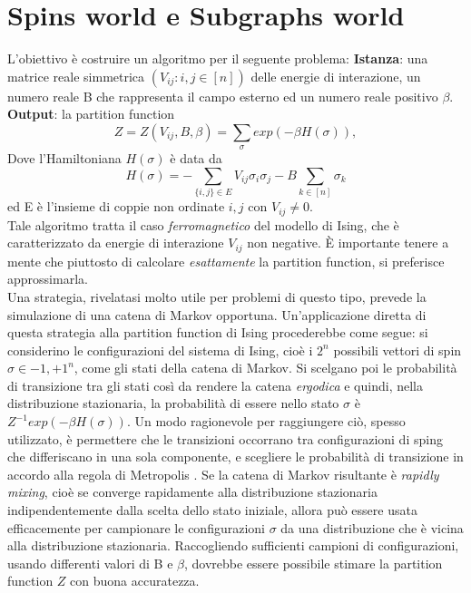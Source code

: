 \section{Spins world e Subgraphs world}
L'obiettivo è costruire un algoritmo per il seguente problema:
\textbf{Istanza}: una matrice reale simmetrica $(V_{ij} : i,j \in [n])$ delle energie di interazione, un numero reale B che rappresenta il campo esterno ed un numero reale positivo $\beta$.
\textbf{Output}: la partition function
\begin{equation}
	Z = Z(V_{ij}, B, \beta) = \sum_{\sigma}{exp(-\beta H(\sigma))},
	\label{partf}
\end{equation}
Dove l'Hamiltoniana $H(\sigma)$ è data da
\begin{equation}
	H(\sigma) = - \sum_{\{i,j\}\in E}{V_{ij}\sigma_i\sigma_j} - B\sum_{k\in [n]}{\sigma_k}
	\label{hamilt}
\end{equation}
ed E è l'insieme di coppie non ordinate ${i, j}$ con $V_{ij} \ne 0$.\\
Tale algoritmo tratta il caso \textit{ferromagnetico} del modello di Ising, che è caratterizzato da energie di interazione $V_{ij}$ non negative. È importante tenere a mente che piuttosto di calcolare \textit{esattamente} la partition function, si preferisce approssimarla.\\
Una strategia, rivelatasi molto utile per problemi di questo tipo, prevede la simulazione di una catena di Markov opportuna. Un'applicazione diretta di questa strategia alla partition function di Ising procederebbe come segue: si considerino le configurazioni del sistema di Ising, cioè i $2^n$ possibili vettori di spin $\sigma \in {-1, +1}^n$, come gli stati della catena di Markov. Si scelgano poi le probabilità di transizione tra gli stati così da rendere la catena \textit{ergodica} e quindi, nella distribuzione stazionaria, la probabilità di essere nello stato $\sigma$ è $Z^{-1}exp(-\beta H(\sigma))$. Un modo ragionevole per raggiungere ciò, spesso utilizzato, è permettere che le transizioni occorrano tra configurazioni di sping che differiscano in una sola componente, e scegliere le probabilità di transizione in accordo alla regola di Metropolis \cite{gelatt1983optimization}. Se la catena di Markov risultante è \textit{rapidly mixing}, cioè se converge rapidamente alla distribuzione stazionaria indipendentemente dalla scelta dello stato iniziale, allora può essere usata efficacemente per campionare le configurazioni $\sigma$ da una distribuzione che è vicina alla distribuzione stazionaria. Raccogliendo sufficienti campioni di configurazioni, usando differenti valori di B e $\beta$, dovrebbe essere possibile stimare la partition function $Z$ con buona accuratezza.\\
